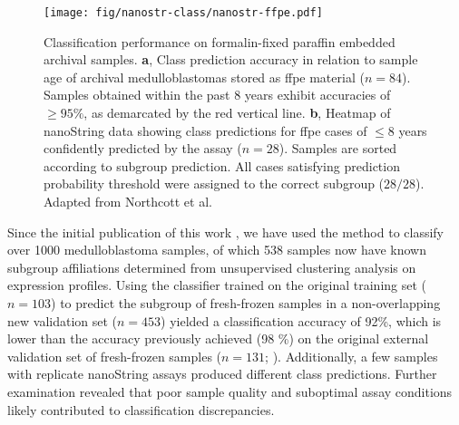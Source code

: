 \begin{figure}[ht]
	\begin{center}
		\texttt{[image: fig/nanostr-class/nanostr-ffpe.pdf]}
	\end{center}
	\caption[Classification performance on formalin-fixed paraffin embedded archival samples]
	{
	Classification performance on formalin-fixed paraffin embedded archival samples.
	\textbf{a}, Class prediction accuracy in relation to sample age of archival medulloblastomas stored as \gls{ffpe} material ($n = 84$). Samples obtained within the past 8 years exhibit accuracies of $\geq 95\%$, as demarcated by the red vertical line.
	\textbf{b}, Heatmap of nanoString data showing class predictions for \gls{ffpe} cases of $\leq 8$ years confidently predicted by the assay ($n = 28$). Samples are sorted according to subgroup prediction. All cases satisfying prediction probability threshold were assigned to the correct subgroup ($28/28$). Adapted from Northcott et al.
	}
	\label{fig:nanostr-ffpe}
\end{figure}

Since the initial publication of this work , we have used the method to classify over 1000 medulloblastoma samples, of which 538 samples now have known subgroup affiliations determined from unsupervised clustering analysis on expression profiles. Using the classifier trained on the original training set ($n = 103$) to predict the subgroup of fresh-frozen samples in a non-overlapping new validation set ($n = 453$) yielded a classification accuracy of 92\%, which is lower than the accuracy previously achieved (98 \%) on the original external validation set of fresh-frozen samples ($n = 131$; ). Additionally, a few samples with replicate nanoString assays produced different class predictions. Further examination revealed that poor sample quality and suboptimal assay conditions likely contributed to classification discrepancies.


